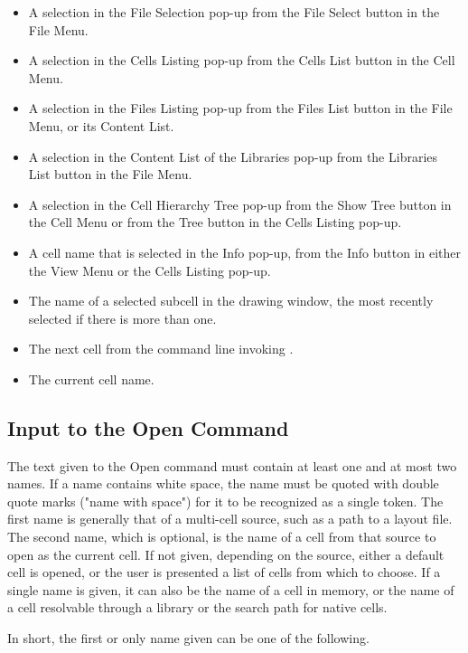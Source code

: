 \begin{itemize}
\item{A selection in the {\cb File Selection} pop-up from the {\cb
 File Select} button in the {\cb File Menu}.}
\item{A selection in the {\cb Cells Listing} pop-up from the {\cb
 Cells List} button in the {\cb Cell Menu}.}
\item{A selection in the {\cb Files Listing} pop-up from the {\cb Files
 List} button in the {\cb File Menu}, or its {\cb Content List}.}
\item{A selection in the {\cb Content List} of the
 {\cb Libraries} pop-up from the {\cb Libraries List} button
 in the {\cb File Menu}.}
\item{A selection in the {\cb Cell Hierarchy Tree} pop-up from the {\cb
 Show Tree} button in the {\cb Cell Menu} or from the {\cb Tree}
 button in the {\cb Cells Listing} pop-up.}
\item{A cell name that is selected in the {\cb Info} pop-up, from
 the {\cb Info} button in either the {\cb View Menu} or the {\cb
 Cells Listing} pop-up.}
\item{The name of a selected subcell in the drawing window, the most
 recently selected if there is more than one.}
\item{The next cell from the command line invoking {\Xic}.}
\item{The current cell name.}
\end{itemize}

\subsection{Input to the Open Command}

The text given to the {\cb Open} command must contain at least one and
at most two names.  If a name contains white space, the name must be
quoted with double quote marks ({\vt "name with space"}) for it to be
recognized as a single token.  The first name is generally that of a
multi-cell source, such as a path to a layout file.  The second name,
which is optional, is the name of a cell from that source to open as
the current cell.  If not given, depending on the source, either a
default cell is opened, or the user is presented a list of cells from
which to choose.  If a single name is given, it can also be the name
of a cell in memory, or the name of a cell resolvable through a
library or the search path for native cells.

In short, the first or only name given can be one of the following.

